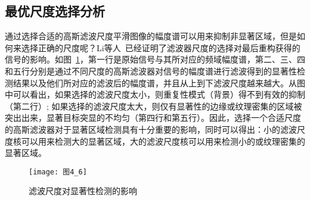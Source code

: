 \subsection{最优尺度选择分析}
\label{4_1_3}

通过选择合适的高斯滤波尺度平滑图像的幅度谱可以用来抑制非显著区域，但是如何来选择正确的尺度呢？Li等人~\cite{LiJianTPAMI2013Scale}已经证明了滤波器尺度的选择对最后重构获得的信号的影响。如图~\ref{图4_6}，第一行是原始信号与其所对应的频域幅度谱，第二、三、四和五行分别是通过不同尺度的高斯滤波器对信号的幅度谱进行滤波得到的显著性检测结果以及他们所对应的滤波后的幅度谱，并且从上到下滤波尺度越来越大。从图中可以看出，如果选择的滤波尺度太小，则重复性模式（背景）得不到有效的抑制（第二行）; 如果选择的滤波尺度太大，则仅有显著性的边缘或纹理密集的区域被突出出来，显著目标突显的不均匀（第四行和第五行）。因此，选择一个合适尺度的高斯滤波器对于显著区域检测具有十分重要的影响，同时可以得出：小的滤波尺度核可以用来检测大的显著区域，大的滤波尺度核可以用来检测小的或纹理密集的显著区域。
\begin{figure}[h]
  \centering
  \texttt{[image: 图4\_6]}
  \caption{滤波尺度对显著性检测的影响}   
  \label{图4_6} 
\end{figure}

